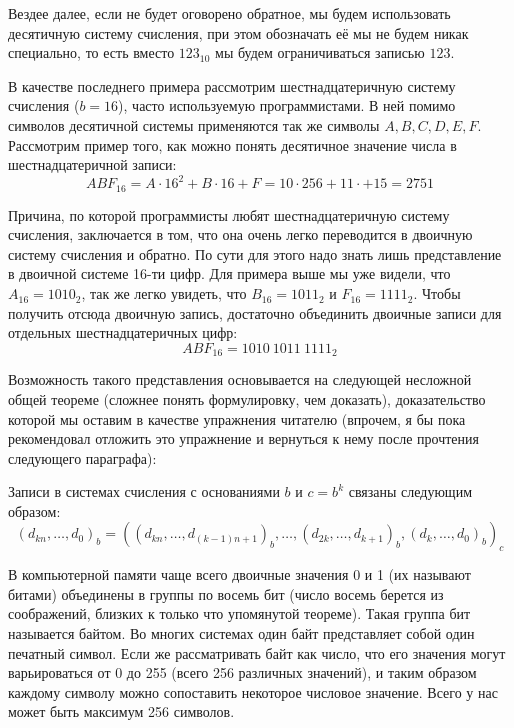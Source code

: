 Вездее далее, если не будет оговорено обратное, мы будем использовать десятичную систему счисления, при этом обозначать её мы не будем никак специально, то есть вместо $123_{10}$ мы будем ограничиваться записью $123$.

В качестве последнего примера рассмотрим шестнадцатеричную систему счисления ($b=16$), часто используемую программистами. В ней помимо символов десятичной системы применяются так же символы $A, B, C, D, E, F$. Рассмотрим пример того, как можно понять десятичное значение числа в шестнадцатеричной записи:
$$ABF_{16} = A\cdot 16^2 + B\cdot 16 + F = 10\cdot 256 + 11 \cdot + 15 = 2751$$

Причина, по которой программисты любят шестнадцатеричную систему счисления, заключается в том, что она очень легко переводится в двоичную систему счисления и обратно. По сути для этого надо знать лишь представление в двоичной системе 16-ти цифр. Для примера выше мы уже видели, что $A_{16} = 1010_2$, так же легко увидеть, что $B_{16} = 1011_2$ и $F_{16} = 1111_2$. Чтобы получить отсюда двоичную запись, достаточно объединить двоичные записи для отдельных шестнадцатеричных цифр: $$ABF_{16} = 1010\:1011\:1111_2$$

Возможность такого представления основывается на следующей несложной общей теореме (сложнее понять формулировку, чем доказать), доказательство которой мы оставим в качестве упражнения читателю (впрочем, я бы пока рекомендовал отложить это упражнение и вернуться к нему после прочтения следующего параграфа):
\begin{thm}
Записи в системах счисления с основаниями $b$ и $c = b^k$ связаны следующим образом: $$(d_{kn},\dots, d_0)_b = ((d_{kn}, \ldots, d_{(k-1)n + 1})_b, \dots, (d_{2k}, \dots, d_{k+1})_b , (d_k, \dots, d_0)_b)_c$$
\end{thm}

В компьютерной памяти чаще всего двоичные значения 0 и 1 (их называют битами) объединены в группы по восемь бит (число восемь берется из соображений, близких к только что упомянутой теореме). Такая группа бит называется байтом. Во многих системах один байт представляет собой один печатный символ. Если же рассматривать байт как число, что его значения могут варьироваться от 0 до 255 (всего 256 различных значений), и таким образом каждому символу можно сопоставить некоторое числовое значение. Всего у нас может быть максимум 256 символов.

